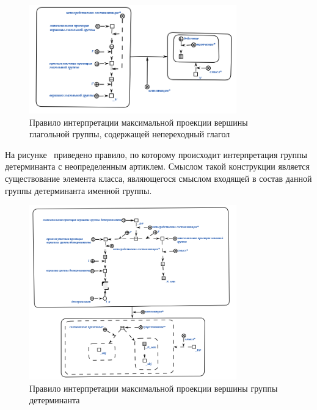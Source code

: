 \begin{figure}[h]
    \centering
    \includegraphics[width=0.8\textwidth]{images/part2/chapter_lang/d_sem_3.png}
    \caption{Правило интерпретации максимальной проекции вершины глагольной группы, содержащей непереходный глагол}
    \label{fig:d_sem_3}
\end{figure}

На рисунке~\textit{} приведено правило, по которому происходит интерпретация группы детерминанта с неопределенным артиклем. Смыслом такой конструкции является существование элемента класса, являющегося смыслом входящей в состав данной группы детерминанта именной группы.

\begin{figure}[h]
    \centering
    \includegraphics[width=0.8\textwidth]{images/part2/chapter_lang/d_sem_4.png}
    \caption{Правило интерпретации максимальной проекции вершины группы детерминанта}
    \label{d_sem_4}
\end{figure}

